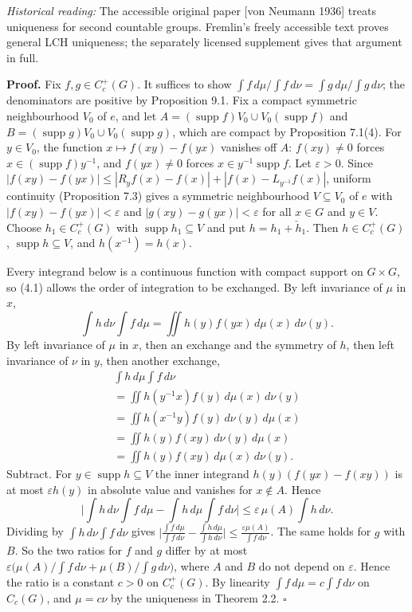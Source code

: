 \documentclass[
  english,
  11pt,
  a4paper,
]{article}
\begin{document}
\emph{Historical reading:} The accessible original paper {[}von Neumann
1936{]} treats uniqueness for second countable groups. Fremlin's freely
accessible text proves general LCH uniqueness; the separately licensed
supplement gives that argument in full.

\textbf{Proof.} Fix \(f,g\in C_c^+(G)\). It suffices to show
\(\int f\,d\mu/\int f\,d\nu=\int g\,d\mu/\int g\,d\nu\); the
denominators are positive by Proposition 9.1. Fix a compact symmetric
neighbourhood \(V_0\) of \(e\), and let
\(A=(\operatorname{supp}f)V_0\cup V_0(\operatorname{supp}f)\) and
\(B=(\operatorname{supp}g)V_0\cup V_0(\operatorname{supp}g)\), which are
compact by Proposition 7.1(4). For \(y\in V_0\), the function
\(x\mapsto f(xy)-f(yx)\) vanishes off \(A\): \(f(xy)\neq0\) forces
\(x\in(\operatorname{supp}f)y^{-1}\), and \(f(yx)\neq0\) forces
\(x\in y^{-1}\operatorname{supp}f\). Let \(\varepsilon>0\). Since
\(|f(xy)-f(yx)|\leq|R_yf(x)-f(x)|+|f(x)-L_{y^{-1}}f(x)|\), uniform
continuity (Proposition 7.3) gives a symmetric neighbourhood
\(V\subseteq V_0\) of \(e\) with \(|f(xy)-f(yx)|<\varepsilon\) and
\(|g(xy)-g(yx)|<\varepsilon\) for all \(x\in G\) and \(y\in V\). Choose
\(h_1\in C_c^+(G)\) with \(\operatorname{supp}h_1\subseteq V\) and put
\(h=h_1+\check h_1\). Then \(h\in C_c^+(G)\),
\(\operatorname{supp}h\subseteq V\), and \(h(x^{-1})=h(x)\).

Every integrand below is a continuous function with compact support on
\(G\times G\), so (4.1) allows the order of integration to be exchanged.
By left invariance of \(\mu\) in \(x\),
\[\int h\,d\nu\int f\,d\mu=\iint h(y)f(yx)\,d\mu(x)\,d\nu(y).\] By left
invariance of \(\mu\) in \(x\), then an exchange and the symmetry of
\(h\), then left invariance of \(\nu\) in \(y\), then another exchange,
\[\begin{gathered}
\int h\,d\mu\int f\,d\nu\\
=\iint h(y^{-1}x)f(y)\,d\mu(x)\,d\nu(y)\\
=\iint h(x^{-1}y)f(y)\,d\nu(y)\,d\mu(x)\\
=\iint h(y)f(xy)\,d\nu(y)\,d\mu(x)\\
=\iint h(y)f(xy)\,d\mu(x)\,d\nu(y).
\end{gathered}\]
Subtract. For \(y\in\operatorname{supp}h\subseteq V\) the inner
integrand \(h(y)(f(yx)-f(xy))\) is at most \(\varepsilon h(y)\) in
absolute value and vanishes for \(x\notin A\). Hence
\[\Big|\int h\,d\nu\int f\,d\mu-\int h\,d\mu\int f\,d\nu\Big|\leq\varepsilon\,\mu(A)\int h\,d\nu .\]
Dividing by \(\int h\,d\nu\int f\,d\nu\) gives
\(\big|\frac{\int f\,d\mu}{\int f\,d\nu}-\frac{\int h\,d\mu}{\int h\,d\nu}\big|\leq\frac{\varepsilon\mu(A)}{\int f\,d\nu}\).
The same holds for \(g\) with \(B\). So the two ratios for \(f\) and
\(g\) differ by at most
\(\varepsilon\big(\mu(A)/\int f\,d\nu+\mu(B)/\int g\,d\nu\big)\), where
\(A\) and \(B\) do not depend on \(\varepsilon\). Hence the ratio is a
constant \(c>0\) on \(C_c^+(G)\). By linearity
\(\int f\,d\mu=c\int f\,d\nu\) on \(C_c(G)\), and \(\mu=c\nu\) by the
uniqueness in Theorem 2.2. \(\square\)
\end{document}
